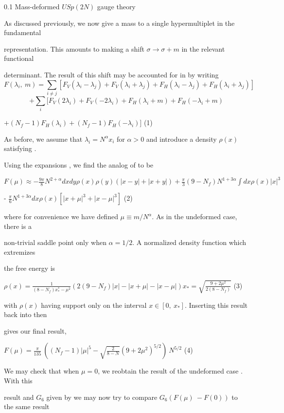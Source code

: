 \documentclass[a4paper,12pt]{article}
\begin{document}
0.1 Mass-deformed $USp(2N)$ gauge theory

As discussed previously, we now give a mass to a single hypermultiplet in the fundamental

representation. This amounts to making a shift $\sigma \rightarrow \sigma+m$ in the relevant functional

determinant. The result of this shift may be accounted for in by writing
$$
F(\lambda_{i},\ m)=\sum_{i\neq j}[F_{V}(\lambda_{i}-\lambda_{j})+F_{V}(\lambda_{i}+\lambda_{j})+F_{H}(\lambda_{i}-\lambda_{j})+F_{H}(\lambda_{i}+\lambda_{j})]
$$
$$
+\sum_{i}[F_{V}(2\lambda_{i})+F_{V}(-2\lambda_{i})+F_{H}(\lambda_{i}+m)+F_{H}(-\lambda_{i}+m)
$$
\begin{center}
$+(N_{f}-1)F_{H}(\lambda_{i})+(N_{f}-1)F_{H}(-\lambda_{i})]$   (1)
\end{center}
As before, we assume that $\lambda_{i} = N^{\alpha}x_{i}$ for $\alpha > 0$ and introduce a density $\rho(x)$ satisfying .

Using the expansions , we find the analog of to be

$F(\displaystyle \mu)\approx-\frac{9\pi}{8}N^{2+\alpha} dxdy\displaystyle \rho(x)\rho(y)(|x-y|+|x+y|)+\frac{\pi}{3}(9-N_{f})N^{1+3\alpha}\int dx\rho(x)|x|^{3}$
\begin{center}
- $\displaystyle \frac{\pi}{6}N^{1+3\alpha} dx\rho(x) [|x+\mu|^{3}+|x-\mu|^{3}]$ (2)
\end{center}
where for convenience we have defined $\mu \equiv m/N^{\alpha}$. As in the undeformed case, there is a

non-trivial saddle point only when $\alpha=1/2$. A normalized density function which extremizes

the free energy is

$\displaystyle \rho(x)=\frac{1}{(8-N_{f})x_{*}^{*}-\mu^{2}}(2(9-N_{f})|x|-|x+\mu|-|x-\mu|) x_{*}=\sqrt{\frac{9+2\mu^{2}}{2(8-N_{f})}}$ (3)

with $\rho(x)$ having support only on the interval $ x\in [0,\ x_{*}]$. Inserting this result back into then

gives our final result,
\begin{center}
$F(\displaystyle \mu)=\frac{\pi}{135}\ ((N_{f}-1)|\mu|^{5}-\sqrt{\frac{2}{8-N}}(9+2\mu^{2})^{5/2})\ N^{5/2}$   (4)
\end{center}
We may check that when $\mu=0$, we reobtain the result of the undeformed case . With this

result and $G_{6}$ given by we may now try to compare $G_{6} (F(\mu)\ -F(0))$ to the same result
\end{document}
